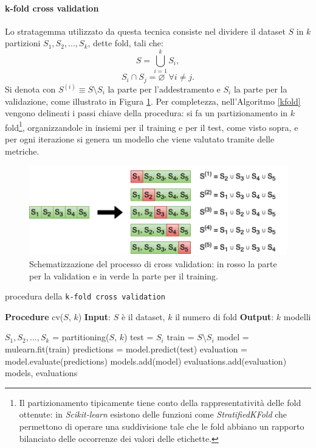 \documentclass[12pt]{report}
\theoremstyle{definition}
\let\emptyset\varnothing
\begin{document}
\paragraph{k-fold cross validation}
Lo stratagemma utilizzato da questa tecnica consiste nel dividere il dataset $S$ in $k$ partizioni $S_1, S_2, ..., S_k$, dette fold, tali che:
\begin{equation}
     S = \bigcup\limits_{i=1}^{k} S_{i},
\end{equation}
\begin{equation}
    S_i \cap S_j = \emptyset \ \ \forall i \neq j.
\end{equation}
Si denota con $S^{(i)} \equiv S \setminus S_i$ la parte per l'addestramento e $S_i$ la parte per la validazione, come illustrato in Figura \ref{cv}.
Per completezza, nell'Algoritmo \ref{kfold} vengono delineati i passi chiave della procedura: si fa un partizionamento in $k$ fold\footnote{Il partizionamento tipicamente tiene conto della rappresentatività delle fold ottenute: in \textit{Scikit-learn} esistono delle funzioni come \textit{StratifiedKFold} che permettono di operare una suddivisione tale che le fold abbiano un rapporto bilanciato delle occorrenze dei valori delle etichette.}, organizzandole in insiemi per il training e per il test, come visto sopra, e per ogni iterazione si genera un modello che viene valutato tramite delle metriche.
\begin{figure}
    \centering
    \includegraphics[scale=0.83]{images/cv.png}
    \caption{Schematizzazione del processo di cross validation: in rosso la parte per la validation e in verde la parte per il training.}
    \label{cv}
\end{figure}
\begin{algorithm}
\caption{procedura della \texttt{k-fold cross validation}}
\label{kfold}
\hspace*{\algorithmicindent} \textbf{Procedure} cv($S$, $k$)
\newline
\hspace*{\algorithmicindent} \textbf{Input}: $S$ è il dataset, $k$ il numero di fold
\newline
\hspace*{\algorithmicindent} \textbf{Output}: $k$ modelli
\begin{algorithmic}[1]
\STATE $S_1, S_2, ..., S_k$ = partitioning($S$, $k$)
\STATE test = $S_i$
\STATE train = $S \setminus S_i$
\STATE model = mulearn.fit(train)
\STATE predictions = model.predict(test)
\STATE evaluation = model.evaluate(predictions)
\STATE models.add(model)
\STATE evaluations.add(evaluation)
\ENDFOR
\RETURN models, evaluations
\end{algorithmic}
\end{algorithm}
\end{document}
